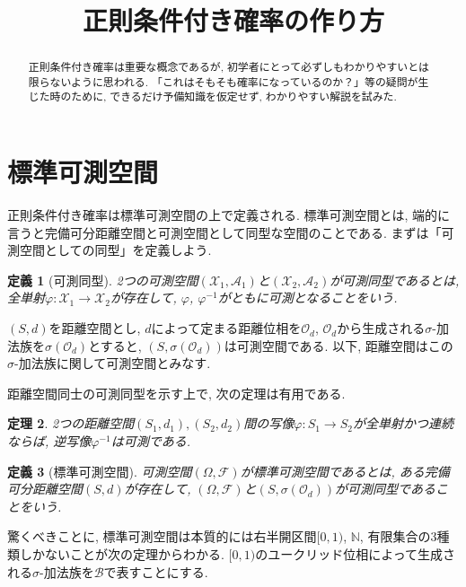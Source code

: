 \documentclass[a4paper,12pt]{jsarticle}
\title{正則条件付き確率の作り方}
\theoremstyle{break}
\newtheorem{theorem}{定理}
\newtheorem{definition}[theorem]{定義}
\begin{document}
\maketitle
\begin{abstract}
正則条件付き確率は重要な概念であるが, 初学者にとって必ずしもわかりやすいとは限らないように思われる. 「これはそもそも確率になっているのか？」等の疑問が生じた時のために, できるだけ予備知識を仮定せず, わかりやすい解説を試みた.
\end{abstract}
\section{標準可測空間}
正則条件付き確率は標準可測空間の上で定義される. 標準可測空間とは, 端的に言うと完備可分距離空間と可測空間として同型な空間のことである. まずは「可測空間としての同型」を定義しよう.
\begin{definition}[可測同型]
2つの可測空間$(\mathcal{X}_1,\mathcal{A}_1)$と$(\mathcal{X}_2,\mathcal{A}_2)$が可測同型であるとは, 全単射$\varphi:\mathcal{X}_1\to\mathcal{X}_2$が存在して, $\varphi$, $\varphi^{-1}$がともに可測となることをいう.
\end{definition}
$(S,d)$を距離空間とし, $d$によって定まる距離位相を$\mathcal{O}_d$, $\mathcal{O}_d$から生成される$\sigma$-加法族を$\sigma(\mathcal{O}_d)$とすると, $(S,\sigma(\mathcal{O}_d))$は可測空間である.
以下, 距離空間はこの$\sigma$-加法族に関して可測空間とみなす.
\par
距離空間同士の可測同型を示す上で, 次の定理は有用である.
\begin{theorem}\label{inv}
2つの距離空間$(S_1,d_1),(S_2,d_2)$間の写像$\varphi:S_1\to S_2$が全単射かつ連続ならば, 逆写像$\varphi^{-1}$は可測である.
\end{theorem}

\begin{definition}[標準可測空間]
可測空間$(\Omega,\mathcal{F})$が標準可測空間であるとは, ある完備可分距離空間$(S,d)$が存在して, $(\Omega,\mathcal{F})$と$(S,\sigma(\mathcal{O}_d))$が可測同型であることをいう.
\end{definition}

驚くべきことに, 標準可測空間は本質的には右半開区間$[0,1)$, $\mathbb{N}$, 有限集合の3種類しかないことが次の定理からわかる. $[0,1)$のユークリッド位相によって生成される$\sigma$-加法族を$\mathcal{B}$で表すことにする.
\end{document}
